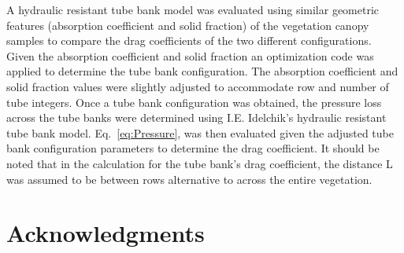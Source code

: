 \documentclass[12pt]{article}
\begin{document}
A hydraulic resistant tube bank model was evaluated using similar geometric features (absorption coefficient and solid fraction) of the vegetation canopy samples to compare the drag coefficients of the two different configurations. Given the absorption coefficient and solid fraction an optimization code was applied to determine the tube bank configuration. The absorption coefficient and solid fraction values were slightly adjusted to accommodate row and number of tube integers. Once a tube bank configuration was obtained, the pressure loss across the tube banks were determined using I.E. Idelchik's hydraulic resistant tube bank model.  Eq.~\ref{eq:Pressure}, was then evaluated given the adjusted tube bank configuration parameters to determine the drag coefficient. It should be noted that in the calculation for the tube bank's drag coefficient, the distance L was assumed to be between rows alternative to across the entire vegetation.\\




\pagebreak

\section*{Acknowledgments}
\end{document}
